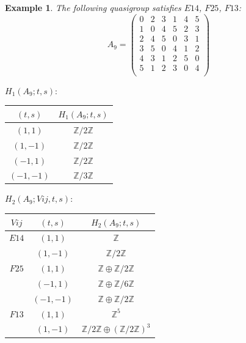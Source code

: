 \documentclass[11pt]{amsart}
\newtheorem{example}[theorem]{Example}
\theoremstyle{definition}
\newcommand{\Z}{\mathbb{Z}}
\begin{document}
\begin{example}
The following quasigroup satisfies 
$E14$, $F25$, $F13$:
   \[ A_9 = \left(
\begin{array}{cccccc}
 0 & 2 & 3 & 1 & 4 & 5 \\
 1 & 0 & 4 & 5 & 2 & 3 \\
 2 & 4 & 5 & 0 & 3 & 1 \\
 3 & 5 & 0 & 4 & 1 & 2 \\
 4 & 3 & 1 & 2 & 5 & 0 \\
 5 & 1 & 2 & 3 & 0 & 4 \\
\end{array}
\right)\]


\bigskip


$H_1(A_9;t,s):$

\begin{center}
    
\begin{tabular}{c|c}
    $(t,s)$ & $H_1(A_9;t,s)$  \\
    \hline
    $(1,1)$ & $\Z/2\Z$ \\
    $(1,-1)$ & $\Z/2\Z$ \\
    $(-1,1)$ & $\Z/2\Z$ \\
    $(-1,-1)$ & $\Z/3\Z$ \\
\end{tabular}
\end{center}
\bigskip

$H_2(A_9;Vij,t,s):$

\begin{center}
    
\begin{tabular}{c|c|c}
    $Vij$ & $(t,s)$ & $H_2(A_9;t,s)$  \\
    \hline


    $E14$ & $(1,1)$ & $\Z$ \\
        & $(1,-1)$ & $\Z/2\Z$ \\
    $F25$ & $(1,1)$ & $\Z \oplus \Z/2\Z$ \\
        & $(-1,1)$ & $\Z \oplus \Z/6\Z$ \\
        & $(-1,-1)$ & $\Z \oplus \Z/2\Z$ \\
    $F13$ & $(1,1)$ & $\Z^5$ \\
        & $(1,-1)$ & $\Z/2\Z \oplus (\Z/2\Z)^3$ \\
\end{tabular}

\end{center}

\end{example}
\end{document}
